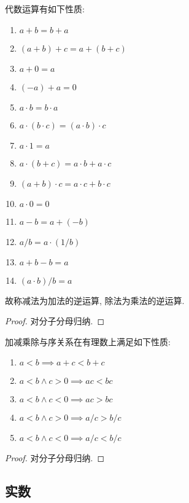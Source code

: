 \begin{lemma}
    代数运算有如下性质:
    \begin{enumerate}
        \item \(a + b = b + a\)
        \item \((a + b) + c = a + (b + c)\)
        \item \(a + 0 = a\)
        \item \((-a) + a = 0\)
        \item \(a \cdot b = b \cdot a\)
        \item \(a \cdot (b \cdot c) = (a \cdot b) \cdot c\)
        \item \(a \cdot 1 = a\)
        \item \(a \cdot (b + c) = a \cdot b + a \cdot c\)
        \item \((a + b) \cdot c = a \cdot c + b \cdot c\)
        \item \(a \cdot 0 = 0\)
        \item \(a - b = a + (-b)\)
        \item \(a / b = a \cdot (1 / b)\)
        \item \(a + b - b = a\)
        \item \((a \cdot b) / b = a\)
    \end{enumerate}
    故称减法为加法的逆运算, 除法为乘法的逆运算.

    \begin{proof}
        对分子分母归纳.
    \end{proof}
\end{lemma}

\begin{lemma}
    加减乘除与序关系在有理数上满足如下性质:
    \begin{enumerate}
        \item \(a < b \implies a + c < b + c\)
        \item \(a < b \land c > 0 \implies ac < bc\)
        \item \(a < b \land c < 0 \implies ac > bc\)
        \item \(a < b \land c > 0 \implies a/c > b/c\)
        \item \(a < b \land c < 0 \implies a/c < b/c\)
    \end{enumerate}

    \begin{proof}
        对分子分母归纳.
    \end{proof}
\end{lemma}

\subsection{实数}

